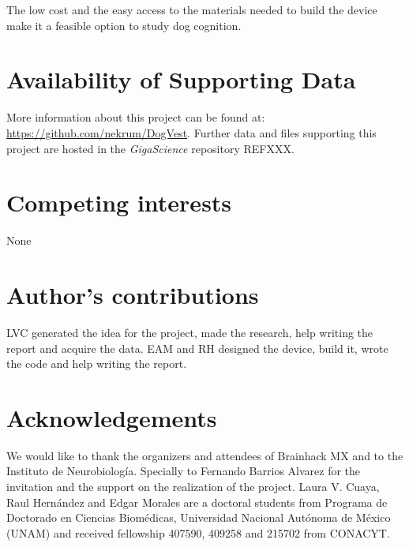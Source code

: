 \documentclass[twocolumn]{bmcart}%
\begin{document}
The low cost and the easy access to the materials needed to build the
device make it a feasible option to study dog cognition.


\begin{backmatter}

\section*{Availability of Supporting Data}
More information about this project can be found at: \url{https://github.com/nekrum/DogVest}. Further data and files supporting this project are hosted in the \emph{GigaScience} repository REFXXX.

\section*{Competing interests}
None

\section*{Author's contributions}
LVC generated the idea for the project, made the research, help writing
the report and acquire the data. EAM and RH designed the device, build
it, wrote the code and help writing the report.

\section*{Acknowledgements}
We would like to thank the organizers and attendees of Brainhack MX and
to the Instituto de Neurobiología. Specially to Fernando Barrios Alvarez
for the invitation and the support on the realization of the project.
Laura V. Cuaya, Raul Hernández and Edgar Morales are a doctoral students
from Programa de Doctorado en Ciencias Biomédicas, Universidad Nacional
Autónoma de México (UNAM) and received fellowship 407590, 409258 and
215702 from CONACYT.

  
  


\end{backmatter}
\end{document}
